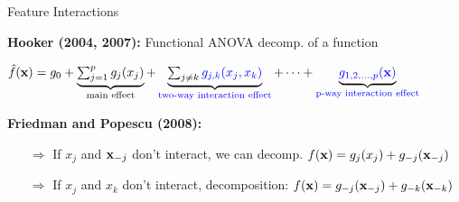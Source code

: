 \documentclass[10pt,compress,t,notes=noshow, xcolor=table]{beamer}
\newcommand{\highlight}[1]{\colorbox{orange}{$\displaystyle #1$}}
\begin{document}
\begin{frame}{Feature Interactions}

\textbf{Hooker (2004, 2007):} Functional ANOVA decomp. of a function%

\begin{center}
    $\textstyle
\hat{f}(\mathbf{x}) = g_0 + 
\underbrace{\textstyle\sum_{j=1}^{p} {{g_j(x_j)}}}_{\text{{main effect}}} + 
\underbrace{\textstyle\sum_{j \neq k} {\textcolor{blue}{g_{j,k}(x_j, x_k)}}}_{\text{\textcolor{blue}{two-way interaction effect}}} + 
\cdots + 
\underbrace{{\textcolor{blue}{g_{1,2,\ldots,p}(\mathbf{x})}}}_{\text{\textcolor{blue}{p-way interaction effect}}}
$
\end{center}

\textbf{Friedman and Popescu (2008):} %



\begin{itemize}
    \item[$\Rightarrow$] 
    If $x_j$ and $\mathbf{x}_{-j}$ don't interact, we can decomp. $f(\mathbf{x}) = g_{j}(x_{j}) + g_{-j}(\mathbf{x}_{-j})$\\
    \item[$\Rightarrow$] 
    If $x_j$ and $x_k$ don't interact, decomposition: $f(\mathbf{x}) = g_{-j}(\mathbf{x}_{-j}) + g_{-k}(\mathbf{x}_{-k})$
\end{itemize}






\end{frame}
\end{document}
